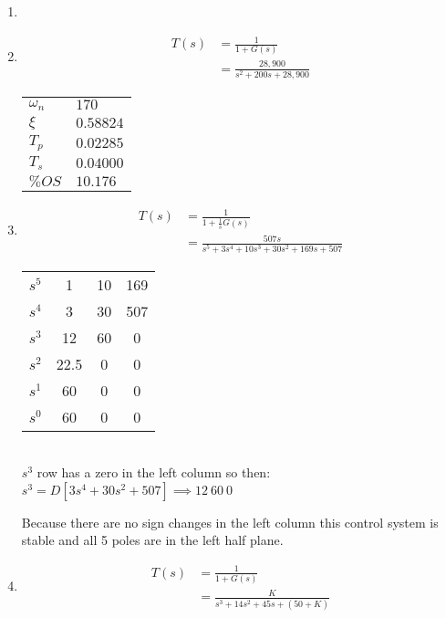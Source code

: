 \documentclass[main.tex]{subfile}
\begin{document}
\begin{enumerate}
	\item
		\begin{minipage}[H]{\textwidth}
			
			
			
		\end{minipage}

	\item
		\begin{align*}
			T(s) &= \frac{1}{1+G(s)}
			\\   &= \frac{28,900}{s^2+200s+28,900}
		\end{align*}

		\begin{center}
			\begin{tabular}{ll}
				$\omega_n$ & $170$
				\\$\xi$ & $0.58824$
				\\$T_p$ & $0.02285$
				\\$T_s$ & $0.04000$
				\\$\%OS$ & $10.176$
			\end{tabular}
		\end{center}

	\item
		\begin{align*}
			T(s) &= \frac{1}{1+\frac{1}{s}G(s)}
			\\   &= \frac{507s}{s^5+3s^4+10s^3+30s^2+169s+507}
		\end{align*}

		\begin{center}
			\begin{tabular}{l|ccc}
				$s^5$ & 1 & 10 & 169
				\\$s^4$ & 3 & 30 & 507
				\\$s^3$ & 12 & 60 & 0
				\\$s^2$ & 22.5 & 0 & 0
				\\$s^1$ & 60 & 0 & 0
				\\$s^0$ & 60 & 0 & 0
				\\\hline
			\end{tabular}
			\\$s^3$ row has a zero in the left column so then:
			\\$s^3 = D[3s^4+30s^2+507] \implies 12\ 60\ 0$
		\end{center}

		Because there are no sign changes in the left column this control system is
		stable and all 5 poles are in the left half plane.

	\item
		\begin{align*}
			T(s) &= \frac{1}{1+G(s)}
			\\   &= \frac{K}{s^3+14s^2+45s+(50+K)}
		\end{align*}


\end{enumerate}
\end{document}
